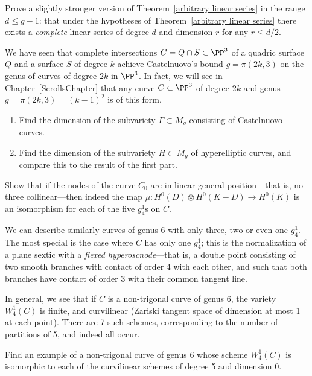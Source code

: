 \begin{exercise}
Prove a slightly stronger version of Theorem~\ref{arbitrary linear series} in the range $d \leq g-1$: that under the hypotheses of Theorem~\ref{arbitrary linear series} there exists a \emph{complete} linear series of degree $d$ and dimension $r$ for any $r \leq d/2$.
\end{exercise}

\begin{exercise}\label{rarity of Castelnuovo}
We have seen that complete intersections $C = Q \cap S \subset \PP^3$ of a quadric surface $Q$ and a surface $S$ of degree $k$ achieve Castelnuovo's bound $g = \pi(2k, 3)$ on the genus of curves of degree $2k$ in $\PP^3$. In fact, we will see in Chapter~\ref{ScrollsChapter} that any curve $C \subset \PP^3$ of degree $2k$ and genus $g = \pi(2k, 3) = (k-1)^2$ is of this form.
\begin{enumerate}
\item Find the dimension of the subvariety $\Gamma \subset M_g$ consisting of Castelnuovo curves.
\item Find the dimension of the subvariety $H \subset M_g$ of hyperelliptic curves, and compare this to the result of the first part.
\end{enumerate}
\end{exercise}


\begin{exercise}\label{nonreduced Wrd}
Show that if the nodes of the curve $C_0$ are in linear general position---that is, no three collinear---then indeed the map $\mu : H^0(D) \otimes H^0(K-D) \to H^0(K)$ is an isomorphism for each of the five $g^1_4$s on $C$.
\end{exercise}

We can describe similarly curves of genus 6 with only three, two or even one $g^1_4$. The most special is the case where $C$ has only one $g^1_4$; this is the normalization of a plane sextic with a \emph{flexed hyperoscnode}---that is, a double point consisting of two smooth branches with contact of order 4 with each other, and such that both branches have contact of order 3 with their common tangent line.

In general, we see that if $C$ is a non-trigonal curve of genus 6, the variety $W^1_4(C)$ is finite, and curvilinear (Zariski tangent space of dimension at most 1 at each point). There are 7 such schemes, corresponding to the number of partitions of 5, and indeed all occur.

\begin{exercise}
Find an example of a non-trigonal curve of genus 6 whose scheme $W^1_4(C)$ is isomorphic to each of the curvilinear schemes of degree 5 and dimension 0.
\end{exercise}

